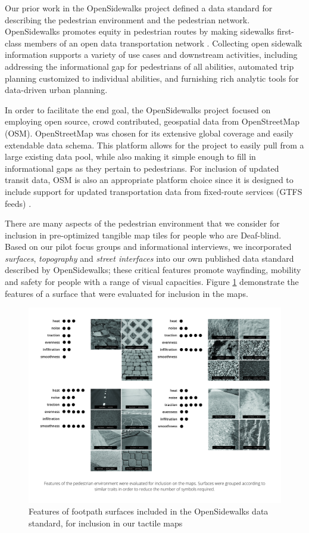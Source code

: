 Our prior work in the OpenSidewalks project defined a data standard for describing the pedestrian environment and the pedestrian network. OpenSidewalks promotes equity in pedestrian routes by making sidewalks first-class members of an open data transportation network \cite{bolten2017}. Collecting open sidewalk information supports a variety of use cases and downstream activities, including addressing the informational gap for pedestrians of all abilities, automated trip planning customized to individual abilities, and furnishing rich analytic tools for data-driven urban planning. 

In order to facilitate the end goal, the OpenSidewalks project focused on employing open source, crowd contributed, geospatial data from OpenStreetMap (OSM). OpenStreetMap was chosen for its extensive global coverage and easily extendable data schema. This platform allows for the project to easily pull from a large existing data pool, while also making it simple enough to fill in informational gaps as they pertain to pedestrians. For inclusion of updated transit data, OSM is also an appropriate platform choice since it is designed to include support for updated transportation data from fixed-route services (GTFS feeds) \cite{OpenStreetMap}.

There are many aspects of the pedestrian environment that we consider for inclusion in pre-optimized tangible map tiles for people who are Deaf-blind.  Based on our pilot focus groups and informational interviews, we incorporated \textit{surfaces}, \textit{topography} and \textit{street interfaces} into our own published data standard described by OpenSidewalks; these critical features promote wayfinding, mobility and safety for people with a range of visual capacities. Figure \ref{fig:DataFeatures} demonstrate the features of a surface that were evaluated for inclusion in the maps. 

\begin{figure}
    \centering
    \includegraphics[width=5in]{pics/SidewalkFeatures.jpg}
    \caption{Features of footpath surfaces included in the OpenSidewalks data standard, for inclusion in our tactile maps}
    \label{fig:DataFeatures}
\end{figure}

